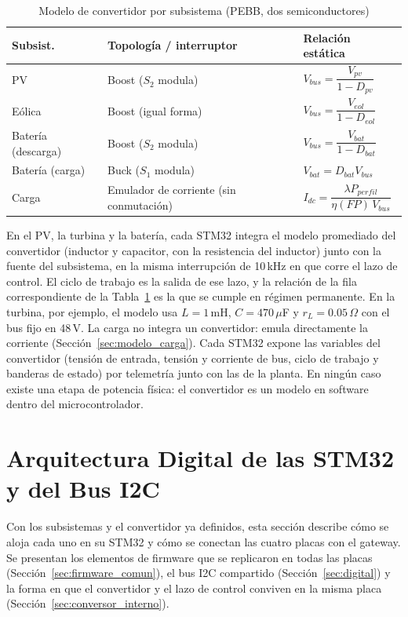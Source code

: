 \documentclass[conference]{IEEEtran}
\begin{document}
\begin{table}[H]
\caption{Modelo de convertidor por subsistema (PEBB, dos semiconductores)}
\label{tab:convertidores}
\centering
\scriptsize
\begin{tabular}{|p{1.3cm}|p{2.5cm}|p{2.7cm}|}
\hline
\textbf{Subsist.} & \textbf{Topología / interruptor} & \textbf{Relación estática} \\
\hline
PV & Boost ($S_2$ modula) & $V_{bus}=\dfrac{V_{pv}}{1-D_{pv}}$ \\
\hline
Eólica & Boost (igual forma) & $V_{bus}=\dfrac{V_{eol}}{1-D_{eol}}$ \\
\hline
Batería (descarga) & Boost ($S_2$ modula) & $V_{bus}=\dfrac{V_{bat}}{1-D_{bat}}$ \\
\hline
Batería (carga) & Buck ($S_1$ modula) & $V_{bat}=D_{bat}V_{bus}$ \\
\hline
Carga & Emulador de corriente (sin conmutación) & $I_{dc}=\dfrac{\lambda P_{perfil}}{\eta(FP)\,V_{bus}}$ \\
\hline
\end{tabular}
\end{table}

En el PV, la turbina y la batería, cada STM32 integra el modelo promediado del convertidor (inductor y capacitor, con la resistencia del inductor) junto con la fuente del subsistema, en la misma interrupción de 10\,kHz en que corre el lazo de control. El ciclo de trabajo es la salida de ese lazo, y la relación de la fila correspondiente de la Tabla~\ref{tab:convertidores} es la que se cumple en régimen permanente. En la turbina, por ejemplo, el modelo usa $L=1$\,mH, $C=470\,\mu$F y $r_L=0.05\,\Omega$ con el bus fijo en 48\,V. %
La carga no integra un convertidor: emula directamente la corriente (Sección~\ref{sec:modelo_carga}). Cada STM32 expone las variables del convertidor (tensión de entrada, tensión y corriente de bus, ciclo de trabajo y banderas de estado) por telemetría junto con las de la planta. En ningún caso existe una etapa de potencia física: el convertidor es un modelo en software dentro del microcontrolador.

\section{Arquitectura Digital de las STM32 y del Bus I2C}
\label{sec:arquitectura}

Con los subsistemas y el convertidor ya definidos, esta sección describe cómo se aloja cada uno en su STM32 y cómo se conectan las cuatro placas con el gateway. Se presentan los elementos de firmware que se replicaron en todas las placas (Sección~\ref{sec:firmware_comun}), el bus I2C compartido (Sección~\ref{sec:digital}) y la forma en que el convertidor y el lazo de control conviven en la misma placa (Sección~\ref{sec:conversor_interno}).
\end{document}
